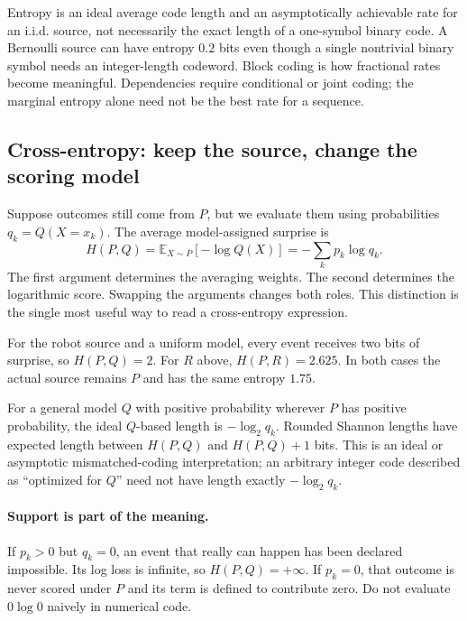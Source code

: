 \begin{warning}
Entropy is an ideal average code length and an asymptotically achievable rate
for an i.i.d. source, not necessarily the exact length of a one-symbol binary
code. A Bernoulli source can have entropy $0.2$ bits even though a single
nontrivial binary symbol needs an integer-length codeword. Block coding is how
fractional rates become meaningful. Dependencies require conditional or joint
coding; the marginal entropy alone need not be the best rate for a sequence.
\end{warning}

\subsection{Cross-entropy: keep the source, change the scoring model}
Suppose outcomes still come from $P$, but we evaluate them using probabilities
$q_k=Q(X=x_k)$. The average model-assigned surprise is
\begin{equation}
\boxed{H(P,Q)=\mathbb E_{X\sim P}[-\log Q(X)]
=-\sum_kp_k\log q_k.}
\label{eq:info12-crossentropy}
\end{equation}
The first argument determines the averaging weights. The second determines the
logarithmic score. Swapping the arguments changes both roles. This distinction
is the single most useful way to read a cross-entropy expression.

For the robot source and a uniform model, every event receives two bits of
surprise, so $H(P,Q)=2$. For $R$ above, $H(P,R)=2.625$. In both cases the actual
source remains $P$ and has the same entropy $1.75$.

For a general model $Q$ with positive probability wherever $P$ has positive
probability, the ideal $Q$-based length is $-\log_2q_k$. Rounded Shannon lengths
have expected length between $H(P,Q)$ and $H(P,Q)+1$ bits. This is an ideal or
asymptotic mismatched-coding interpretation; an arbitrary integer code described
as ``optimized for $Q$'' need not have length exactly $-\log_2q_k$.

\paragraph{Support is part of the meaning.}
If $p_k>0$ but $q_k=0$, an event that really can happen has been declared
impossible. Its log loss is infinite, so $H(P,Q)=+\infty$. If $p_k=0$, that
outcome is never scored under $P$ and its term is defined to contribute zero.
Do not evaluate $0\log0$ naively in numerical code.

